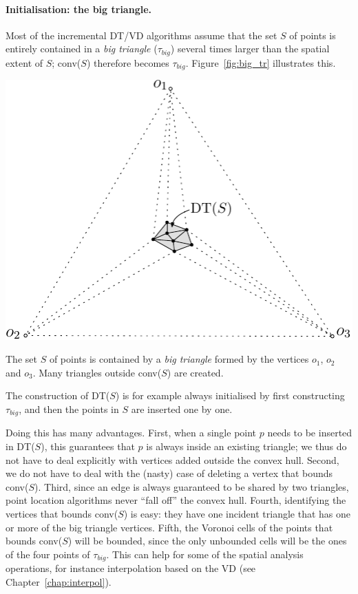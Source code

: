 \paragraph{Initialisation: the big triangle.}%
\label{sec:big_tr}
Most of the incremental DT/VD algorithms assume that the set $S$ of points is entirely contained in a \emph{big triangle} ($\tau_{big}$) several times larger than the spatial extent of $S$; conv($S$) therefore becomes $\tau_{big}$. 
Figure~\ref{fig:big_tr} illustrates this.
\begin{marginfigure}
  \includegraphics[width=\textwidth]{figs/big_tr}
  \caption[The big triangle containing all the dataset.]{The set $S$ of points is contained by a \emph{big triangle} formed by the vertices $o_1$, $o_2$ and $o_3$. Many triangles outside conv($S$) are created.}%
\label{fig:big_tr}
\end{marginfigure}
The construction of DT($S$) is for example always initialised by first constructing $\tau_{big}$, and then the points in $S$ are inserted one by one. 

%

Doing this has many advantages. 
First, when a single point $p$ needs to be inserted in DT($S$), this guarantees that $p$ is always inside an existing triangle; we thus do not have to deal explicitly with vertices added outside the convex hull. 
Second, we do not have to deal with the (nasty) case of deleting a vertex that bounds conv($S$). 
Third, since an edge is always guaranteed to be shared by two triangles, point location algorithms never ``fall off'' the convex hull. 
Fourth, identifying the vertices that bounds conv($S$) is easy: they have one incident triangle that has one or more of the big triangle vertices.
Fifth, the Voronoi cells of the points that bounds conv($S$) will be bounded, since the only unbounded cells will be the ones of the four points of $\tau_{big}$. 
This can help for some of the spatial analysis operations, for instance interpolation based on the VD (see Chapter~\ref{chap:interpol}).

